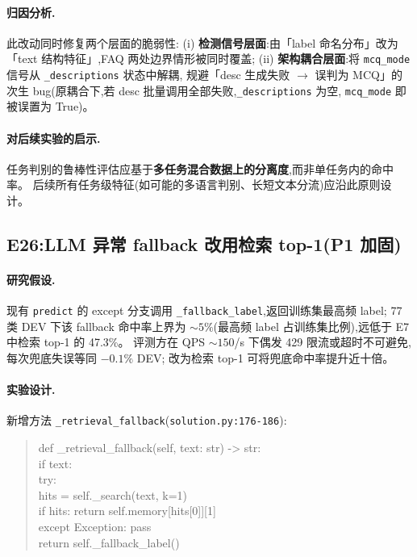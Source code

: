 \documentclass[11pt,a4paper]{ctexart}
\begin{document}
\paragraph{归因分析.}此改动同时修复两个层面的脆弱性:
(i) \textbf{检测信号层面}:由「label 命名分布」改为「text 结构特征」,FAQ 两处边界情形被同时覆盖;
(ii) \textbf{架构耦合层面}:将 \texttt{mcq\_mode} 信号从 \texttt{\_descriptions} 状态中解耦,
规避「desc 生成失败 $\to$ 误判为 MCQ」的次生 bug(原耦合下,若 desc 批量调用全部失败,\texttt{\_descriptions} 为空,
\texttt{mcq\_mode} 即被误置为 True)。

\paragraph{对后续实验的启示.}任务判别的鲁棒性评估应基于\textbf{多任务混合数据上的分离度},而非单任务内的命中率。
后续所有任务级特征(如可能的多语言判别、长短文本分流)应沿此原则设计。

\subsection{E26:LLM 异常 fallback 改用检索 top-1(P1 加固)}

\paragraph{研究假设.}现有 \texttt{predict} 的 except 分支调用 \texttt{\_fallback\_label},返回训练集最高频 label;
77 类 DEV 下该 fallback 命中率上界为 $\sim 5\%$(最高频 label 占训练集比例),远低于 E7 中检索 top-1 的 47.3\%。
评测方在 QPS $\sim 150$/s 下偶发 429 限流或超时不可避免,每次兜底失误等同 $-0.1\%$ DEV;
改为检索 top-1 可将兜底命中率提升近十倍。

\paragraph{实验设计.}新增方法 \texttt{\_retrieval\_fallback}(\texttt{solution.py:176-186}):

\begin{quote}\small\ttfamily
def \_retrieval\_fallback(self, text: str) -> str:\\
\quad if text:\\
\qquad try:\\
\qquad\quad hits = self.\_search(text, k=1)\\
\qquad\quad if hits: return self.memory[hits[0]][1]\\
\qquad except Exception: pass\\
\quad return self.\_fallback\_label()
\end{quote}
\end{document}
